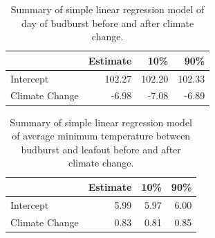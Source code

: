 \documentclass{article}\usepackage[]{graphicx}\usepackage[]{color}
\begin{document}
{

\begin{table}[H]
\centering
\caption{Summary of simple linear regression model of day of budburst before and after climate change.} 
\begin{tabular}{lrrr}
  \hline
 & Estimate & 10\% & 90\% \\ 
  \hline
Intercept & 102.27 & 102.20 & 102.33 \\ 
  Climate Change & -6.98 & -7.08 & -6.89 \\ 
   \hline
\end{tabular}
\end{table}
\begin{table}[H]
\centering
\caption{Summary of simple linear regression model of average minimum temperature between budburst and leafout before and after climate change.} 
\begin{tabular}{lrrr}
  \hline
 & Estimate & 10\% & 90\% \\ 
  \hline
Intercept & 5.99 & 5.97 & 6.00 \\ 
  Climate Change & 0.83 & 0.81 & 0.85 \\ 
   \hline
\end{tabular}
\end{table}


}
\end{document}
